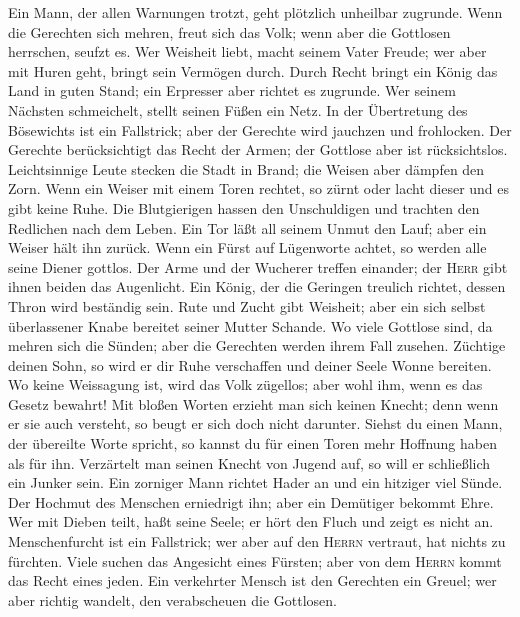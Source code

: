  Ein Mann, der allen Warnungen trotzt, geht plötzlich
unheilbar zugrunde.  Wenn die Gerechten sich mehren, freut
sich das Volk; wenn aber die Gottlosen herrschen, seufzt es.
 Wer Weisheit liebt, macht seinem Vater Freude; wer aber
mit Huren geht, bringt sein Vermögen durch.  Durch Recht
bringt ein König das Land in guten Stand; ein Erpresser aber richtet es
zugrunde.  Wer seinem Nächsten schmeichelt, stellt seinen
Füßen ein Netz.  In der Übertretung des Bösewichts ist ein
Fallstrick; aber der Gerechte wird jauchzen und frohlocken.
 Der Gerechte berücksichtigt das Recht der Armen; der
Gottlose aber ist rücksichtslos.  Leichtsinnige Leute
stecken die Stadt in Brand; die Weisen aber dämpfen den Zorn.
 Wenn ein Weiser mit einem Toren rechtet, so zürnt oder
lacht dieser und es gibt keine Ruhe.  Die Blutgierigen
hassen den Unschuldigen und trachten den Redlichen nach dem Leben.
 Ein Tor läßt all seinem Unmut den Lauf; aber ein Weiser
hält ihn zurück.  Wenn ein Fürst auf Lügenworte achtet,
so werden alle seine Diener gottlos.  Der Arme und der
Wucherer treffen einander; der \textsc{Herr} gibt ihnen beiden das
Augenlicht.  Ein König, der die Geringen treulich
richtet, dessen Thron wird beständig sein.  Rute und
Zucht gibt Weisheit; aber ein sich selbst überlassener Knabe bereitet
seiner Mutter Schande.  Wo viele Gottlose sind, da mehren
sich die Sünden; aber die Gerechten werden ihrem Fall zusehen.
 Züchtige deinen Sohn, so wird er dir Ruhe verschaffen
und deiner Seele Wonne bereiten.  Wo keine Weissagung
ist, wird das Volk zügellos; aber wohl ihm, wenn es das Gesetz bewahrt!
 Mit bloßen Worten erzieht man sich keinen Knecht; denn
wenn er sie auch versteht, so beugt er sich doch nicht darunter.
 Siehst du einen Mann, der übereilte Worte spricht, so
kannst du für einen Toren mehr Hoffnung haben als für ihn.
 Verzärtelt man seinen Knecht von Jugend auf, so will er
schließlich ein Junker sein.  Ein zorniger Mann richtet
Hader an und ein hitziger viel Sünde.  Der Hochmut des
Menschen erniedrigt ihn; aber ein Demütiger bekommt Ehre.
 Wer mit Dieben teilt, haßt seine Seele; er hört den
Fluch und zeigt es nicht an.  Menschenfurcht ist ein
Fallstrick; wer aber auf den \textsc{Herrn} vertraut, hat nichts zu
fürchten.  Viele suchen das Angesicht eines Fürsten; aber
von dem \textsc{Herrn} kommt das Recht eines jeden.  Ein
verkehrter Mensch ist den Gerechten ein Greuel; wer aber richtig
wandelt, den verabscheuen die Gottlosen.

